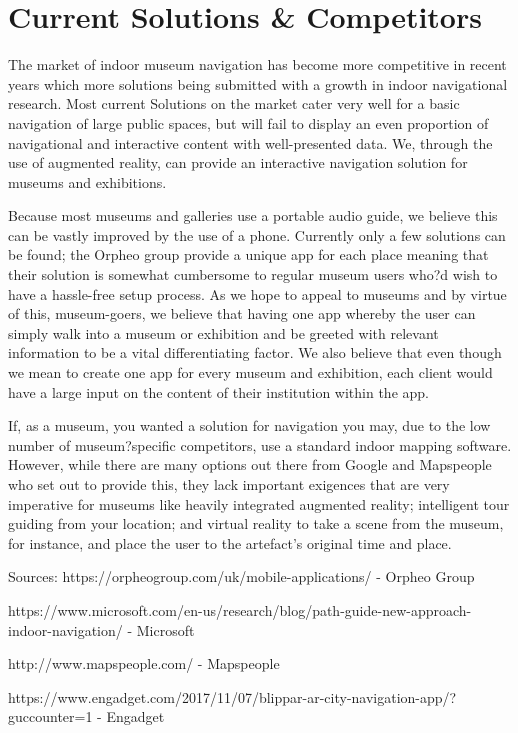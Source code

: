 \section{Current Solutions & Competitors}

The market of indoor museum navigation has become more competitive in recent years which more solutions being submitted with a growth in indoor navigational research. Most current Solutions on the market cater very well for a basic navigation of large public spaces, but will fail to display an even proportion of navigational and interactive content with well-presented data. We, through the use of augmented reality, can provide an interactive navigation solution for museums and exhibitions.  
 
Because most museums and galleries use a portable audio guide, we believe this can be vastly improved by the use of a phone. Currently only a few solutions can be found; the Orpheo group provide a unique app for each place meaning that their solution is somewhat cumbersome to regular museum users who?d wish to have a hassle-free setup process. As we hope to appeal to museums and by virtue of this, museum-goers, we believe that having one app whereby the user can simply walk into a museum or exhibition and be greeted with relevant information to be a vital differentiating factor. We also believe that even though we mean to create one app for every museum and exhibition, each client would have a large input on the content of their institution within the app. 

If, as a museum, you wanted a solution for navigation you may, due to the low number of museum?specific competitors, use a standard indoor mapping software. However, while there are many options out there from Google and Mapspeople who set out to provide this, they lack important exigences that are very imperative for museums like heavily integrated augmented reality; intelligent tour guiding from your location; and virtual reality to take a scene from the museum, for instance, and place the user to the artefact's original time and place.  
 
Sources:
https://orpheogroup.com/uk/mobile-applications/ - Orpheo Group 

https://www.microsoft.com/en-us/research/blog/path-guide-new-approach-indoor-navigation/ - Microsoft

http://www.mapspeople.com/ - Mapspeople

https://www.engadget.com/2017/11/07/blippar-ar-city-navigation-app/?guccounter=1 - Engadget 


